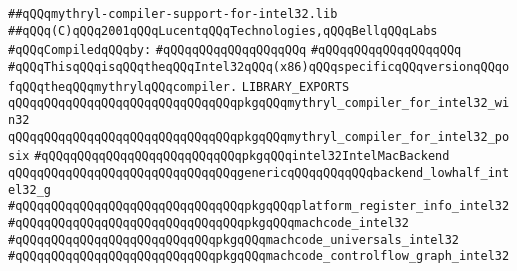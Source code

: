 \label{src/lib/compiler/mythryl-compiler-support-for-intel32.lib}
\verb|##qQQqmythryl-compiler-support-for-intel32.lib|\newline
\verb|##qQQq(C)qQQq2001qQQqLucentqQQqTechnologies,qQQqBellqQQqLabs|\newline
\newline
\verb|#qQQqCompiledqQQqby:|\newline
\verb|#qQQqqQQqqQQqqQQqqQQq|\newline
\verb|#qQQqqQQqqQQqqQQqqQQq|\newline
\newline
\newline
\newline
\verb|#qQQqThisqQQqisqQQqtheqQQqIntel32qQQq(x86)qQQqspecificqQQqversionqQQqofqQQqtheqQQqmythrylqQQqcompiler.|\newline
\newline
\newline
\newline
\newline
\verb|LIBRARY_EXPORTS|\newline
\newline
\verb|qQQqqQQqqQQqqQQqqQQqqQQqqQQqqQQqpkgqQQqmythryl_compiler_for_intel32_win32|\newline
\verb|qQQqqQQqqQQqqQQqqQQqqQQqqQQqqQQqpkgqQQqmythryl_compiler_for_intel32_posix|\newline
\newline
\verb|#qQQqqQQqqQQqqQQqqQQqqQQqqQQqpkgqQQqintel32IntelMacBackend|\newline
\newline
\newline
\verb|qQQqqQQqqQQqqQQqqQQqqQQqqQQqqQQqgenericqQQqqQQqqQQqbackend_lowhalf_intel32_g|\newline
\newline
\verb|#qQQqqQQqqQQqqQQqqQQqqQQqqQQqqQQqpkgqQQqplatform_register_info_intel32|\newline
\verb|#qQQqqQQqqQQqqQQqqQQqqQQqqQQqqQQqpkgqQQqmachcode_intel32|\newline
\verb|#qQQqqQQqqQQqqQQqqQQqqQQqqQQqpkgqQQqmachcode_universals_intel32|\newline
\verb|#qQQqqQQqqQQqqQQqqQQqqQQqqQQqpkgqQQqmachcode_controlflow_graph_intel32|\newline
